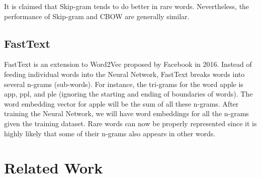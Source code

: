 It is claimed that Skip-gram tends to do better in rare words. Nevertheless, the performance of Skip-gram and CBOW are generally similar.

\subsection{FastText}

FastText is an extension to Word2Vec proposed by Facebook in 2016. Instead of feeding individual words into the Neural Network, FastText breaks words into several n-grams (sub-words). For instance, the tri-grams for the word apple is app, ppl, and ple (ignoring the starting and ending of boundaries of words). The word embedding vector for apple will be the sum of all these n-grams. After training the Neural Network, we will have word embeddings for all the n-grams given the training dataset. Rare words can now be properly represented since it is highly likely that some of their n-grams also appears in other words.\cite{word2vecFastText}

\section{Related Work}

